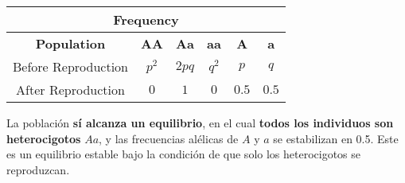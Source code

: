 \documentclass{article}
\begin{document}
\begin{table}[h!]
\centering
\begin{tabular}{c|ccc|cc}
\multicolumn{6}{c}{\textbf{Frequency}} \\
\hline
\textbf{Population} & \textbf{AA} & \textbf{Aa} & \textbf{aa} & \textbf{A} & \textbf{a} \\
\hline
Before Reproduction & \( p^2 \) & \( 2pq \) & \( q^2 \) & \( p \) & \( q \) \\
After Reproduction  & \( 0 \)   & \( 1 \)   & \( 0 \)   & \( 0.5 \) & \( 0.5 \) \\
\hline
\end{tabular}
\end{table}
La población \textbf{sí alcanza un equilibrio}, en el cual \textbf{todos los individuos son heterocigotos} \( Aa \), y las frecuencias alélicas de \( A \) y \( a \) se estabilizan en 0.5.  
Este es un equilibrio estable bajo la condición de que solo los heterocigotos se reproduzcan.
\end{document}
